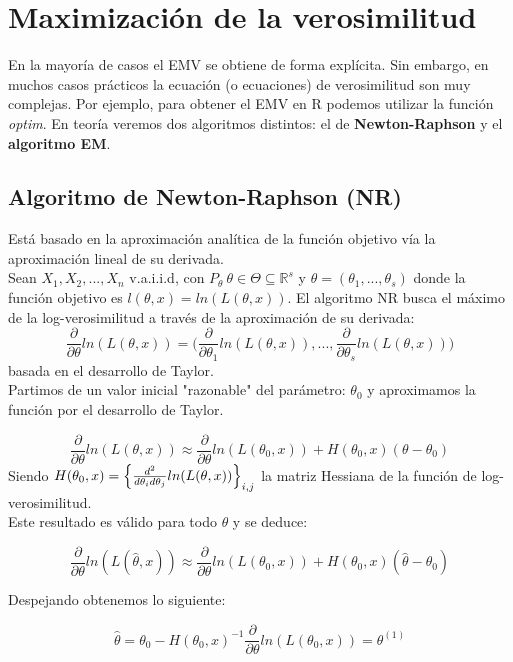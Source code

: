 
\section{Maximización de la verosimilitud}

En la mayoría de casos el EMV se obtiene de forma explícita. Sin embargo, en muchos casos prácticos la ecuación (o ecuaciones) de verosimilitud son muy complejas.
Por ejemplo, para obtener el EMV en R podemos utilizar la función \textit{optim}. En teoría veremos dos algoritmos distintos: el de \textbf{Newton-Raphson} y el \textbf{algoritmo EM}. 

\subsection{Algoritmo de Newton-Raphson (NR)}

Está basado en la aproximación analítica de la función objetivo vía la aproximación lineal de su derivada. \\

Sean $X_1, X_2,...,X_n$ v.a.i.i.d, con $P_\theta\ \theta\in\Theta\subseteq \mathbb{R}^s$ y $\theta=(\theta_1,...,\theta_s)$ donde la función objetivo es $l(\theta,x)=ln(L(\theta,x))$.
El algoritmo NR busca el máximo de la log-verosimilitud a través de la aproximación de su derivada: 
$$\frac{\partial}{\partial\theta}ln(L(\theta,x))=\Big(\frac{\partial}{\partial\theta_1}ln(L(\theta,x)),...,\frac{\partial}{\partial\theta_s}ln(L(\theta,x))\Big)$$
basada en el desarrollo de Taylor.\\

Partimos de un valor inicial "razonable" del parámetro: $\theta_0$ y aproximamos la función por el desarrollo de Taylor.

$$\frac{\partial}{\partial\theta}ln(L(\theta,x))\approx\frac{\partial}{\partial\theta}ln(L(\theta_0,x))+H(\theta_0,x)(\theta-\theta_0)$$
Siendo $H(\theta_0,x)=\Big{\{}\frac{d^2}{d\theta_i d\theta_j}ln(L(\theta,x))\Big{\}}_{i,j}$ la matriz Hessiana de la función de log-verosimilitud. \\

Este resultado es válido para todo $\theta$ y se deduce:

$$\frac{\partial}{\partial\theta}ln(L(\hat\theta,x))\approx\frac{\partial}{\partial\theta}ln(L(\theta_0,x))+H(\theta_0,x)(\hat\theta-\theta_0)$$

Despejando obtenemos lo siguiente:

$$\hat\theta=\theta_0-H(\theta_0,x)^{-1}\frac{\partial}{\partial\theta}ln(L(\theta_0,x))=\theta^{(1)}$$

